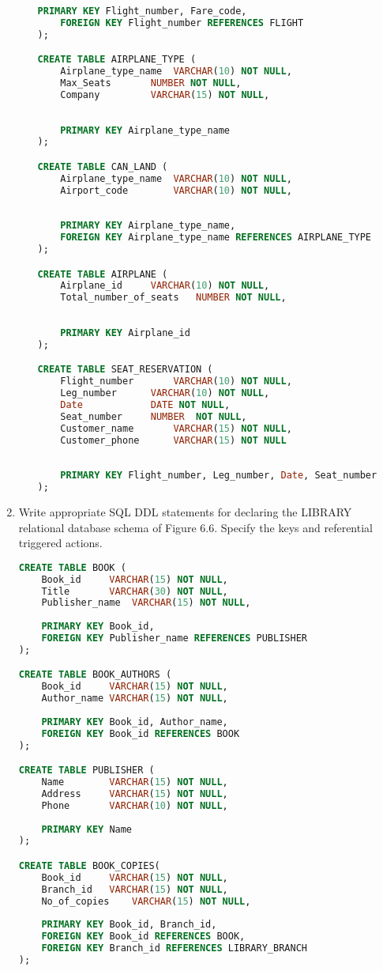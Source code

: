 \documentclass[12pt]{article}
\begin{document}
\begin{enumerate}
\begin{enumerate}
\begin{lstlisting}[language=sql]
	PRIMARY KEY Flight_number, Fare_code,
	FOREIGN KEY Flight_number REFERENCES FLIGHT
);

CREATE TABLE AIRPLANE_TYPE (
	Airplane_type_name	VARCHAR(10) NOT NULL,
	Max_Seats		NUMBER NOT NULL,
	Company			VARCHAR(15) NOT NULL,
	
	
	PRIMARY KEY Airplane_type_name
);

CREATE TABLE CAN_LAND (
	Airplane_type_name	VARCHAR(10) NOT NULL,
	Airport_code		VARCHAR(10) NOT NULL,
	
	
	PRIMARY KEY Airplane_type_name,
	FOREIGN KEY Airplane_type_name REFERENCES AIRPLANE_TYPE
);

CREATE TABLE AIRPLANE (
	Airplane_id		VARCHAR(10) NOT NULL,
	Total_number_of_seats	NUMBER NOT NULL,
	
	
	PRIMARY KEY Airplane_id
);

CREATE TABLE SEAT_RESERVATION (
	Flight_number		VARCHAR(10) NOT NULL,
	Leg_number		VARCHAR(10) NOT NULL,
	Date			DATE NOT NULL,
	Seat_number		NUMBER	NOT NULL,
	Customer_name		VARCHAR(15) NOT NULL,
	Customer_phone		VARCHAR(15) NOT NULL
	
	
	PRIMARY KEY Flight_number, Leg_number, Date, Seat_number
);
		\end{lstlisting}
	\end{enumerate}
	\pagebreak
	\item Write appropriate SQL DDL statements for declaring the LIBRARY relational database schema of Figure 6.6. Specify the keys and referential triggered actions.
		\begin{lstlisting}[language=sql]
CREATE TABLE BOOK (
	Book_id		VARCHAR(15) NOT NULL,
	Title		VARCHAR(30) NOT NULL,
	Publisher_name	VARCHAR(15) NOT NULL,
	
	PRIMARY KEY Book_id,
	FOREIGN KEY Publisher_name REFERENCES PUBLISHER
);

CREATE TABLE BOOK_AUTHORS (
	Book_id		VARCHAR(15) NOT NULL,
	Author_name	VARCHAR(15) NOT NULL,
	
	PRIMARY KEY Book_id, Author_name,
	FOREIGN KEY Book_id REFERENCES BOOK
);

CREATE TABLE PUBLISHER (
	Name		VARCHAR(15) NOT NULL,
	Address		VARCHAR(15) NOT NULL,
	Phone		VARCHAR(10) NOT NULL,
	
	PRIMARY KEY Name
);

CREATE TABLE BOOK_COPIES(
	Book_id		VARCHAR(15) NOT NULL,
	Branch_id	VARCHAR(15) NOT NULL,
	No_of_copies	VARCHAR(15) NOT NULL,
	
	PRIMARY KEY Book_id, Branch_id,
	FOREIGN KEY Book_id REFERENCES BOOK,
	FOREIGN KEY Branch_id REFERENCES LIBRARY_BRANCH
);


\end{lstlisting}
\end{enumerate}
\end{document}
